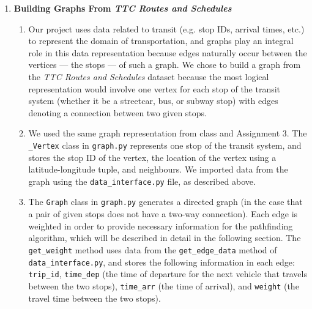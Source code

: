 \documentclass[fontsize=11pt]{article}
\begin{document}
\begin{enumerate}
\begin{enumerate}
        \end{enumerate}

        \item \textbf{Building Graphs From \emph{TTC Routes and Schedules}} \begin{enumerate}
                                                                                \item Our project uses data related to transit (e.g. stop IDs, arrival times, etc.) to represent the domain of transportation, and graphs play an integral role in this data representation because edges naturally occur between the vertices — the stops — of such a graph. We chose to build a graph from the \emph{TTC Routes and Schedules} dataset because the most logical representation would involve one vertex for each stop of the transit system (whether it be a streetcar, bus, or subway stop) with edges denoting a connection between two given stops. \\

                                                                                \item We used the same graph representation from class and Assignment 3. The \texttt{\_Vertex} class in \texttt{graph.py} represents one stop of the transit system, and stores the stop ID of the vertex, the location of the vertex using a latitude-longitude tuple, and neighbours. We imported data from the graph using the \texttt{data\_interface.py} file, as described above. \\

                                                                                \item The \texttt{Graph} class in \texttt{graph.py} generates a directed graph (in the case that a pair of given stops does not have a two-way connection). Each edge is weighted in order to provide necessary information for the pathfinding algorithm, which will be described in detail in the following section. The \texttt{get\_weight} method uses data from the \texttt{get\_edge\_data} method of \texttt{data\_interface.py}, and stores the following information in each edge: \texttt{trip\_id}, \texttt{time\_dep} (the time of departure for the next vehicle that travels between the two stops), \texttt{time\_arr} (the time of arrival), and \texttt{weight} (the travel time between the two stops). \\

        \end{enumerate}


\end{enumerate}
\end{document}
